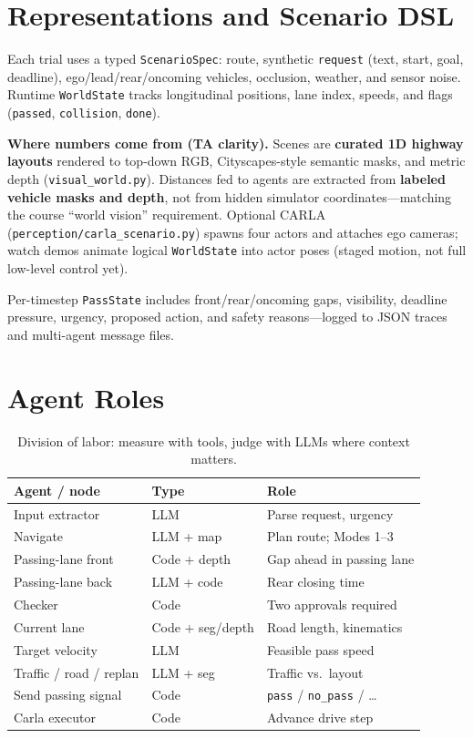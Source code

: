 \documentclass[10pt,twocolumn,letterpaper]{article}
\begin{document}
\section{Representations and Scenario DSL}
Each trial uses a typed \texttt{ScenarioSpec}:
route, synthetic \texttt{request} (text, start, goal, deadline), ego/lead/rear/oncoming vehicles, occlusion, weather, and sensor noise.
Runtime \texttt{WorldState} tracks longitudinal positions, lane index, speeds, and flags (\texttt{passed}, \texttt{collision}, \texttt{done}).

\textbf{Where numbers come from (TA clarity).}
Scenes are \textbf{curated 1D highway layouts} rendered to top-down RGB, Cityscapes-style semantic masks, and metric depth (\texttt{visual\_world.py}).
Distances fed to agents are extracted from \textbf{labeled vehicle masks and depth}, not from hidden simulator coordinates---matching the course ``world vision'' requirement.
Optional CARLA (\texttt{perception/carla\_scenario.py}) spawns four actors and attaches ego cameras; watch demos animate logical \texttt{WorldState} into actor poses (staged motion, not full low-level control yet).

Per-timestep \texttt{PassState} includes front/rear/oncoming gaps, visibility, deadline pressure, urgency, proposed action, and safety reasons---logged to JSON traces and multi-agent message files.

\section{Agent Roles}
\begin{table}[t]
\centering
\small
\begin{tabular}{@{}lll@{}}
\toprule
Agent / node & Type & Role \\
\midrule
Input extractor & LLM & Parse request, urgency \\
Navigate & LLM + map & Plan route; Modes 1--3 \\
Passing-lane front & Code + depth & Gap ahead in passing lane \\
Passing-lane back & LLM + code & Rear closing time \\
Checker & Code & Two approvals required \\
Current lane & Code + seg/depth & Road length, kinematics \\
Target velocity & LLM & Feasible pass speed \\
Traffic / road / replan & LLM + seg & Traffic vs.\ layout \\
Send passing signal & Code & \texttt{pass} / \texttt{no\_pass} / \ldots \\
Carla executor & Code & Advance drive step \\
\bottomrule
\end{tabular}
\caption{Division of labor: measure with tools, judge with LLMs where context matters.}
\label{tab:agents}
\vspace{-6pt}
\end{table}
\end{document}
